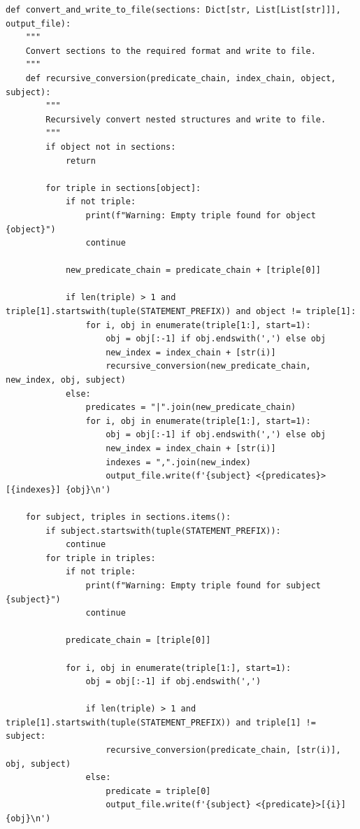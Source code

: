 {\footnotesize
\begin{verbatim}
def convert_and_write_to_file(sections: Dict[str, List[List[str]]], output_file):
    """
    Convert sections to the required format and write to file.
    """
    def recursive_conversion(predicate_chain, index_chain, object, subject):
        """
        Recursively convert nested structures and write to file.
        """
        if object not in sections:
            return

        for triple in sections[object]:
            if not triple:
                print(f"Warning: Empty triple found for object {object}")
                continue

            new_predicate_chain = predicate_chain + [triple[0]]

            if len(triple) > 1 and triple[1].startswith(tuple(STATEMENT_PREFIX)) and object != triple[1]:
                for i, obj in enumerate(triple[1:], start=1):
                    obj = obj[:-1] if obj.endswith(',') else obj
                    new_index = index_chain + [str(i)]
                    recursive_conversion(new_predicate_chain, new_index, obj, subject)
            else:
                predicates = "|".join(new_predicate_chain)
                for i, obj in enumerate(triple[1:], start=1):
                    obj = obj[:-1] if obj.endswith(',') else obj
                    new_index = index_chain + [str(i)]
                    indexes = ",".join(new_index)
                    output_file.write(f'{subject} <{predicates}>[{indexes}] {obj}\n')

    for subject, triples in sections.items():
        if subject.startswith(tuple(STATEMENT_PREFIX)):
            continue
        for triple in triples:
            if not triple:
                print(f"Warning: Empty triple found for subject {subject}")
                continue

            predicate_chain = [triple[0]]

            for i, obj in enumerate(triple[1:], start=1):
                obj = obj[:-1] if obj.endswith(',')

                if len(triple) > 1 and triple[1].startswith(tuple(STATEMENT_PREFIX)) and triple[1] != subject:
                    recursive_conversion(predicate_chain, [str(i)], obj, subject)
                else:
                    predicate = triple[0]
                    output_file.write(f'{subject} <{predicate}>[{i}] {obj}\n')
\end{verbatim}
}

